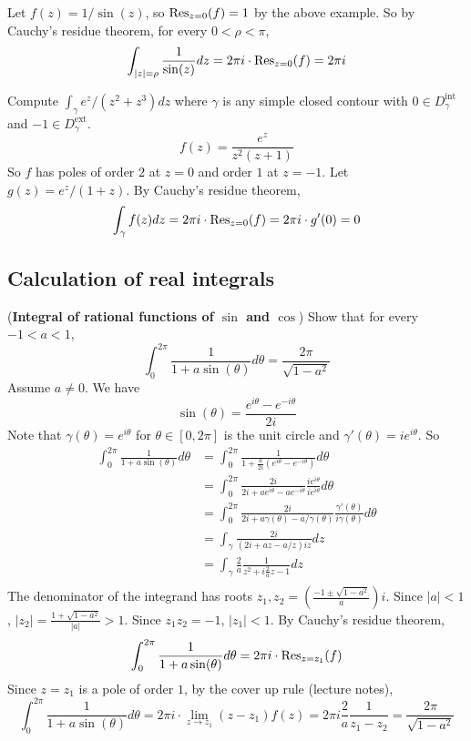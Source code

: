 \begin{example}
	Let $f(z) = 1 / \sin(z)$, so $\text{Res}_{z = 0}(f) = 1$ by the above example. So by Cauchy's residue theorem, for every $0 < \rho < \pi$,
	\[
		\int_{|z| = \rho} \frac{1}{\sin(z)} dz = 2 \pi i \cdot \text{Res}_{z = 0}(f) = 2 \pi i
	\]
\end{example}

\begin{example}
	Compute $\int_{\gamma} e^z / (z^2 + z^3) dz$ where $\gamma$ is any simple closed contour with $0 \in D_{\gamma}^{\text{int}}$ and $-1 \in D_{\gamma}^{\text{ext}}$.
	\[
		f(z) = \frac{e^z}{z^2 (z + 1)}
	\]
	So $f$ has poles of order $2$ at $z = 0$ and order $1$ at $z = -1$. Let $g(z) = e^z / (1 + z)$. By Cauchy's residue theorem,
	\[
		\int_{\gamma} f(z) dz = 2 \pi i \cdot \text{Res}_{z = 0}(f) = 2 \pi i \cdot g'(0) = 0
	\]
\end{example}

\subsection{Calculation of real integrals}

\begin{example}\label{exa:integralRationalTrigFunctions}
	(\textbf{Integral of rational functions of $\sin$ and $\cos$}) Show that for every $-1 < a < 1$,
	\[
		\int_{0}^{2 \pi} \frac{1}{1 + a \sin(\theta)} d\theta = \frac{2 \pi}{\sqrt{1 - a^2}}
	\]
	Assume $a \ne 0$. We have
	\[
		\sin(\theta) = \frac{e^{i\theta} - e^{-i\theta}}{2i}
	\]
	Note that $\gamma(\theta) = e^{i\theta}$ for $\theta \in [0, 2 \pi]$ is the unit circle and $\gamma'(\theta) = i e^{i\theta}$. So
	\[
		\begin{aligned}
			\int_{0}^{2 \pi} \frac{1}{1 + a \sin(\theta)} d\theta & = \int_{0}^{2 \pi} \frac{1}{1 + \frac{a}{2i} (e^{i\theta} - e^{-i\theta})} d\theta \\
			& = \int_{0}^{2 \pi} \frac{2i}{2i + a e^{i\theta} - a e^{-i\theta}} \frac{i e^{i \theta}}{i e^{i \theta}} d\theta \\
			& = \int_{0}^{2 \pi} \frac{2i}{2i + a \gamma(\theta) - a / \gamma(\theta)} \frac{\gamma'(\theta)}{i \gamma(\theta)} d\theta \\
			& = \int_{\gamma} \frac{2i}{(2i + az - a/z) iz} dz \\
			& = \int_{\gamma} \frac{2}{a} \frac{1}{z^2 + i \frac{2}{a} z - 1} dz \\
		\end{aligned}
	\]
	The denominator of the integrand has roots $z_1, z_2 = \left( \frac{-1 \pm \sqrt{1 - a^2}}{a} \right) i$. Since $|a| < 1$, $|z_2| = \frac{1 + \sqrt{1 - a^2}}{|a|} > 1$. Since $z_1 z_2 = -1$, $|z_1| < 1$. By Cauchy's residue theorem,
	\[
		\int_{0}^{2 \pi} \frac{1}{1 + a \sin(\theta)} d\theta = 2 \pi i \cdot \text{Res}_{z = z_1}(f)
	\]
	Since $z = z_1$ is a pole of order $1$, by the cover up rule (lecture notes),
	\[
		\int_{0}^{2 \pi} \frac{1}{1 + a \sin(\theta)} d\theta = 2 \pi i \cdot \lim_{z \to z_1} (z - z_1) f(z) = 2 \pi i \frac{2}{a} \frac{1}{z_1 - z_2} = \frac{2 \pi}{\sqrt{1 - a^2}}
	\]
\end{example}

